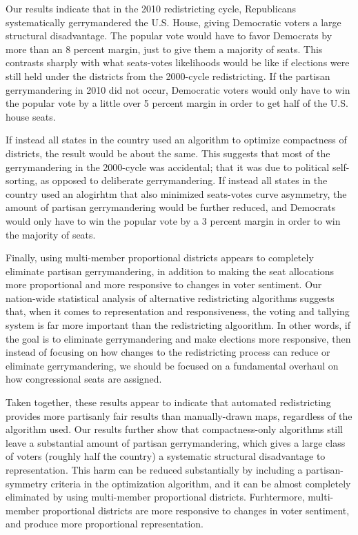 \documentclass[preprint,12pt]{article}
\begin{document}
Our results indicate that in the 2010 redistricting cycle, Republicans systematically gerrymandered the U.S. House, giving Democratic voters a large structural disadvantage. The popular vote would have to favor Democrats by more than an 8 percent margin, just to give them a majority of seats.  This contrasts sharply with what seats-votes likelihoods would be like if elections were still held under the districts from the 2000-cycle redistricting.  If the partisan gerrymandering in 2010 did not occur, Democratic voters would only have to win the popular vote by a little over 5 percent margin in order to get half of the U.S. house seats.

If instead all states in the country used an algorithm to optimize compactness of districts, the result would be about the same.  This suggests that most of the gerrymandering in the 2000-cycle was accidental; that it was due to political self-sorting, as opposed to deliberate gerrymandering.  If instead all states in the country used an alogirhtm that also minimized seats-votes curve asymmetry, the amount of partisan gerrymandering would be further reduced, and Democrats would only have to win the popular vote by a 3 percent margin in order to win the majority of seats.

Finally, using multi-member proportional districts appears to completely eliminate partisan gerrymandering, in addition to making the seat allocations more proportional and more responsive to changes in voter sentiment.  Our nation-wide statistical analysis of alternative redistricting algorithms suggests that, when it comes to representation and responsiveness, the voting and tallying system is far more important than the redistricting algoorithm.  In other words, if the goal is to eliminate gerrymandering and make elections more responsive, then instead of focusing on how changes to the redistricting process can reduce or eliminate gerrymandering, we should be focused on a fundamental overhaul on how congressional seats are assigned.

Taken together, these results appear to indicate that automated redistricting provides more partisanly fair results than manually-drawn maps, regardless of the algorithm used.  Our results further show that compactness-only algorithms still leave a substantial amount of partisan gerrymandering, which gives a large class of voters (roughly half the country) a systematic structural disadvantage to representation.  This harm can be reduced substantially by including a partisan-symmetry criteria in the optimization algorithm, and it can be almost completely eliminated by using multi-member proportional districts.  Furhtermore, multi-member proportional districts are more responsive to changes in voter sentiment, and produce more proportional representation.
\end{document}
